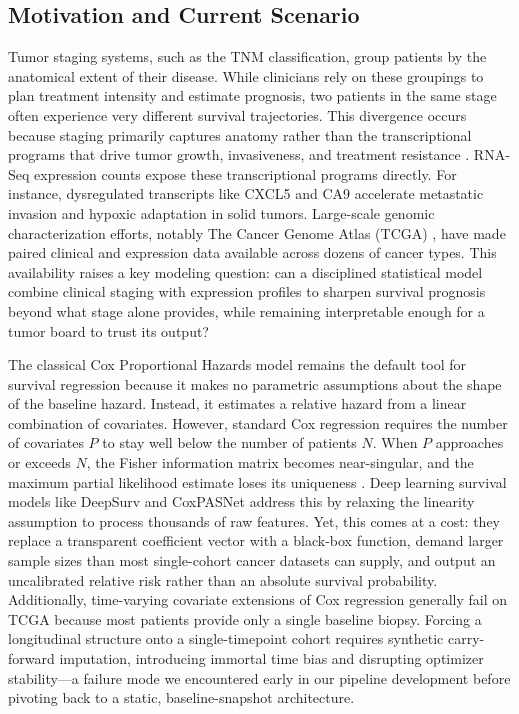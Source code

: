 \documentclass[10pt,a4paper]{article}
\begin{document}
\subsection{Motivation and Current Scenario}
Tumor staging systems, such as the TNM classification, group patients by the anatomical extent of their disease. While clinicians rely on these groupings to plan treatment intensity and estimate prognosis, two patients in the same stage often experience very different survival trajectories. This divergence occurs because staging primarily captures anatomy rather than the transcriptional programs that drive tumor growth, invasiveness, and treatment resistance \cite{vanhouwelingen2006crossvalidated}. RNA-Seq expression counts expose these transcriptional programs directly. For instance, dysregulated transcripts like CXCL5 \cite{grunkin2011cxcl5} and CA9 \cite{giatromanolaki2001ca9} accelerate metastatic invasion and hypoxic adaptation in solid tumors. Large-scale genomic characterization efforts, notably The Cancer Genome Atlas (TCGA) \cite{weinstein2013cancer}, have made paired clinical and expression data available across dozens of cancer types. This availability raises a key modeling question: can a disciplined statistical model combine clinical staging with expression profiles to sharpen survival prognosis beyond what stage alone provides, while remaining interpretable enough for a tumor board to trust its output?

The classical Cox Proportional Hazards model remains the default tool for survival regression because it makes no parametric assumptions about the shape of the baseline hazard. Instead, it estimates a relative hazard from a linear combination of covariates. However, standard Cox regression requires the number of covariates $P$ to stay well below the number of patients $N$. When $P$ approaches or exceeds $N$, the Fisher information matrix becomes near-singular, and the maximum partial likelihood estimate loses its uniqueness \cite{tibshirani1997lasso}. Deep learning survival models like DeepSurv \cite{katzman2018deepsurv} and CoxPASNet \cite{hao2018coxpasnet} address this by relaxing the linearity assumption to process thousands of raw features. Yet, this comes at a cost: they replace a transparent coefficient vector with a black-box function, demand larger sample sizes than most single-cohort cancer datasets can supply, and output an uncalibrated relative risk rather than an absolute survival probability. Additionally, time-varying covariate extensions of Cox regression generally fail on TCGA because most patients provide only a single baseline biopsy. Forcing a longitudinal structure onto a single-timepoint cohort requires synthetic carry-forward imputation, introducing immortal time bias and disrupting optimizer stability---a failure mode we encountered early in our pipeline development before pivoting back to a static, baseline-snapshot architecture.
\end{document}
